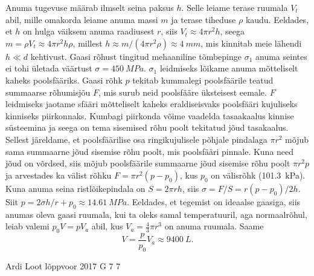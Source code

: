 \documentclass[11pt]{article}
\begin{document}
{{\ifSolution
Anuma tugevuse määrab ilmselt seina paksus $h$. Selle leiame terase ruumala $V_t$ abil, mille omakorda leiame anuma massi $m$ ja terase tiheduse $\rho$ kaudu. Eeldades, et $h$ on hulga väiksem anuma raadiusest $r$, siis $V_t\approx4\pi r^2 h$, seega $m=\rho V_t \approx 4\pi r^2h\rho$, millest $h\approx m/(4\pi r^2\rho)\approx \SI{4}{mm}$, mis kinnitab meie lähendi $h\ll d$ kehtivust. Gaasi rõhust tingitud mehaaniline tõmbepinge $\sigma_1$ anuma seintes ei tohi ületada väärtust $\sigma=\SI{450}{MPa}$. $\sigma_1$ leidmiseks lõikame anuma mõtteliselt kaheks poolsfääriks.
Gaasi rõhk $p$ tekitab kummalegi poolsfäärile teatud summaarse rõhumisjõu $F$, mis surub neid poolsfääre üksteisest eemale. $F$ leidmiseks jaotame sfääri mõtteliselt kaheks eraldiseisvaks poolsfääri kujuliseks kinniseks piirkonnaks. Kumbagi piirkonda võime vaadelda tasaakaalus kinnise süsteemina ja seega on tema sisemised rõhu poolt tekitatud jõud tasakaalus. Sellest järeldame, et poolsfäärilise osa ringikujulisele põhjale pindalaga $\pi r^2$ mõjub sama summaarne jõud sisemise rõhu poolt, mis poolsfääri pinnale. Kuna need jõud on võrdsed, siis mõjub poolsfäärile summaarne jõud sisemise rõhu poolt $\pi r^2 p$ ja arvestades ka välist rõhku $F=\pi r^2(p-p_0)$, kus $p_0$ on välisrõhk (\SI{101.3}{kPa}). Kuna anuma seina ristlõikepindala on $S=2\pi rh$, siis $\sigma=F/S=r(p-p_0)/2h$. Siit $p=2\sigma h/r+p_0\approx \SI{14.61}{MPa}$. Eeldades, et tegemist on ideaalse gaasiga, siis anumas oleva gaasi ruumala, kui ta oleks samal temperatuuril, aga normaalrõhul, leiab valemi $p_0V=pV_a$ abil, kus $V_a=\frac{4}{3}\pi r^3$ on anuma ruumala. Saame
\[
V=\frac{p}{p_0}V_a\approx\SI{9400}{L}.
\]
\fi
}

{Ardi Loot} %
{lõppvoor} %
{2017} %
{G 7} %
{7} %
{

}}
\end{document}
